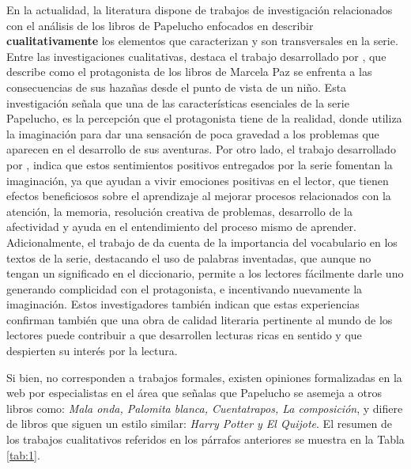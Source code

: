 En la actualidad, la literatura dispone de trabajos de investigación relacionados con el análisis de los libros de Papelucho enfocados en describir \textbf{cualitativamente} los elementos que caracterizan y son transversales en la serie. Entre las investigaciones cualitativas, destaca el trabajo desarrollado por \citet{Ibaceta2021}, que describe como el protagonista de los libros de Marcela Paz se enfrenta a las consecuencias de sus hazañas desde el punto de vista de un niño. Esta investigación señala que una de las características esenciales de la serie Papelucho, es la percepción que el protagonista tiene de la realidad, donde utiliza la imaginación para dar una sensación de poca gravedad a los problemas que aparecen en el desarrollo de sus aventuras. Por otro lado, el trabajo desarrollado por \citet{VILLARROEL2015}, indica que estos sentimientos positivos entregados por la serie fomentan la imaginación, ya que ayudan a vivir emociones positivas en el lector, que tienen efectos beneficiosos sobre el aprendizaje al mejorar procesos relacionados con la atención, la memoria, resolución creativa de problemas, desarrollo de la afectividad y ayuda en el entendimiento del proceso mismo de aprender. Adicionalmente, el trabajo de \citet{TRONCOSO-ARAOS2019} da cuenta de la importancia del vocabulario en los textos de la serie, destacando el uso de palabras inventadas, que aunque no tengan un significado en el diccionario, permite a los lectores fácilmente darle uno generando complicidad con el protagonista, e incentivando nuevamente la imaginación. Estos investigadores también indican que estas experiencias confirman también que una obra de calidad literaria pertinente al mundo de los lectores puede contribuir a que desarrollen lecturas ricas en sentido y que despierten su interés por la lectura.

Si bien, no corresponden a trabajos formales, existen opiniones formalizadas en la web por especialistas en el área que señalas que Papelucho se asemeja a otros libros como: \textit{Mala onda, Palomita blanca, Cuentatrapos, La composición}, y difiere de libros que siguen un estilo similar: \textit{Harry Potter y El Quijote}. El resumen de los trabajos cualitativos referidos en los párrafos anteriores se muestra en la Tabla \ref{tab:1}.  



        

